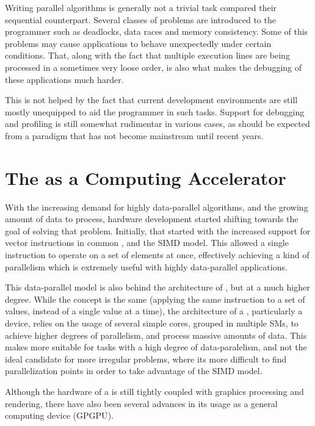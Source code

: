 \documentclass[main.tex]{subfiles}
\begin{document}
Writing parallel algorithms is generally not a trivial task compared their sequential counterpart. Several classes of problems are introduced to the programmer such as deadlocks, data races and memory consistency. Some of this problems may cause applications to behave unexpectedly under certain conditions. That, along with the fact that multiple execution lines are being processed in a sometimes very loose order, is also what makes the debugging of these applications much harder.

This is not helped by the fact that current development environments are still mostly unequipped to aid the programmer in such tasks. Support for debugging and profiling is still somewhat rudimentar in various cases, as should be expected from a paradigm that has not become mainstream until recent years.


\section{The \gpu as a Computing Accelerator}

With the increasing demand for highly data-parallel algorithms, and the growing amount of data to process, hardware development started shifting towards the goal of solving that problem. Initially, that started with the increased support for vector instructions in common \cpus, and the \acs{SIMD} model. This allowed a single instruction to operate on a set of elements at once, effectively achieving a kind of parallelism which is extremely useful with highly data-parallel applications.

This data-parallel model is also behind the architecture of \gpus, but at a much higher degree. While the concept is the same (applying the same instruction to a set of values, instead of a single value at a time), the architecture of a \gpu, particularly a \cuda device, relies on the usage of several simple cores, grouped in multiple \aclp{SM}, to achieve higher degrees of parallelism, and process massive amounts of data. This makes \gpus more suitable for tasks with a high degree of data-paralelism, and not the ideal candidate for more irregular problems, where its more difficult to find parallelization points in order to take advantage of the \acs{SIMD} model.

Although the hardware of a \gpu is still tightly coupled with graphics processing and rendering, there have also been several advances in its usage as a general computing device (\acs{GPGPU}).

\end{document}
